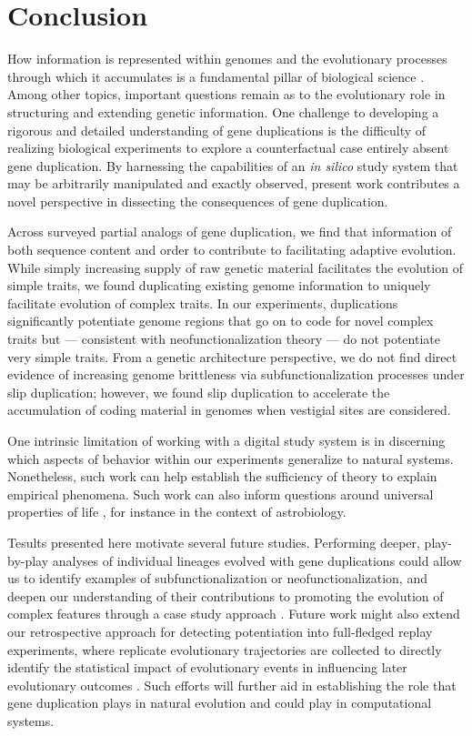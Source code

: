 \section{Conclusion} \label{sec:conclusion}

How information is represented within genomes and the evolutionary processes through which it accumulates is a fundamental pillar of biological science \citep{adami2024evolution}.
Among other topics, important questions remain as to the evolutionary role in structuring and extending genetic information.
One challenge to developing a rigorous and detailed understanding of gene duplications is the difficulty of realizing biological experiments to explore a counterfactual case entirely absent gene duplication.
By harnessing the capabilities of an \textit{in silico} study system that may be arbitrarily manipulated and exactly observed, present work contributes a novel perspective in dissecting the consequences of gene duplication.

Across surveyed partial analogs of gene duplication, we find that information of both sequence content and order to contribute to facilitating adaptive evolution.
While simply increasing supply of raw genetic material facilitates the evolution of simple traits, we found duplicating existing genome information to uniquely facilitate evolution of complex traits.
In our experiments, duplications significantly potentiate genome regions that go on to code for novel complex traits but --- consistent with neofunctionalization theory --- do not potentiate very simple traits.
From a genetic architecture perspective, we do not find direct evidence of increasing genome brittleness via subfunctionalization processes under slip duplication; however, we found slip duplication to accelerate the accumulation of coding material in genomes when vestigial sites are considered.

One intrinsic limitation of working with a digital study system is in discerning which aspects of behavior within our experiments generalize to natural systems.
Nonetheless, such work can help establish the sufficiency of theory to explain empirical phenomena.
Such work can also inform questions around universal properties of life \citep{dorin2024what}, for instance in the context of astrobiology.

Tesults presented here motivate several future studies.
Performing deeper, play-by-play analyses of individual lineages evolved with gene duplications could allow us to identify examples of subfunctionalization or neofunctionalization, and deepen our understanding of  their contributions to promoting the evolution of complex features through a case study approach \citep{mcphee2018detailed}.
Future work might also extend our retrospective approach for detecting potentiation into full-fledged replay experiments, where replicate evolutionary trajectories are collected to directly identify the statistical impact of evolutionary events in influencing later evolutionary outcomes \citep{blount2018contingency,Ferguson2023}.
Such efforts will further aid in establishing the role that gene duplication plays in natural evolution and could play in computational systems.

